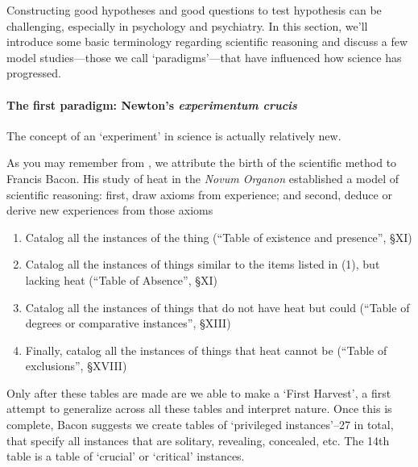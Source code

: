 \begin{refsection}
Constructing good hypotheses and good questions to test hypothesis can be challenging, especially in psychology and psychiatry. In this section, we'll introduce some basic terminology regarding scientific reasoning and discuss a few model studies---those we call `paradigms'---that have influenced how science has progressed.

\paragraph{The first paradigm: Newton's \emph{experimentum crucis}}
\label{thefirstparadigm:newtonsexperimentumcrucis}

The concept of an `experiment' in science is actually relatively new. 

As you may remember from , we attribute the birth of the scientific method to Francis Bacon. His study of heat in the \emph{Novum Organon} established a model of scientific reasoning: first, draw axioms from experience; and second, deduce or derive new experiences from those axioms ~\citep[Bk. II, \S X]{Bacon:1620ui}

\begin{enumerate}
\item Catalog all the instances of the thing (``Table of existence and presence'', \S XI)

\item Catalog all the instances of things similar to the items listed in (1), but lacking heat (``Table of Absence'', \S XI)

\item Catalog all the instances of things that do not have heat but could (``Table of degrees or comparative instances'', \S XIII)

\item Finally, catalog all the instances of things that heat cannot be (``Table of exclusions'', \S XVIII)

\end{enumerate}

Only after these tables are made are we able to make a `First Harvest', a first attempt to generalize across all these tables and interpret nature. Once this is complete, Bacon suggests we create tables of `privileged instances'--27 in total, that specify all instances that are solitary, revealing, concealed, etc. The 14th table is a table of `crucial' or `critical' instances.

\begin{quote}


\end{quote}
\end{refsection}
